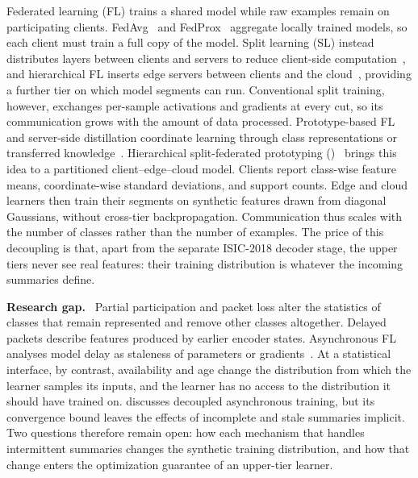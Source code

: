 Federated learning (FL) trains a shared model while raw examples remain on participating clients. FedAvg~\cite{mcmahan2017communication} and FedProx~\cite{li2020federated} aggregate locally trained models, so each client must train a full copy of the model. Split learning (SL) instead distributes layers between clients and servers to reduce client-side computation~\cite{vepakomma2018split}, and hierarchical FL inserts edge servers between clients and the cloud~\cite{liu2020client}, providing a further tier on which model segments can run. Conventional split training, however, exchanges per-sample activations and gradients at every cut, so its communication grows with the amount of data processed.
Prototype-based FL and server-side distillation coordinate learning through class representations or transferred knowledge~\cite{tan2022fedproto,lin2020ensemble,zhu2021data}. Hierarchical split-federated prototyping (\hsfp{})~\cite{tran2026h} brings this idea to a partitioned client--edge--cloud model. Clients report class-wise feature means, coordinate-wise standard deviations, and support counts. Edge and cloud learners then train their segments on synthetic features drawn from diagonal Gaussians, without cross-tier backpropagation. Communication thus scales with the number of classes rather than the number of examples. The price of this decoupling is that, apart from the separate ISIC-2018 decoder stage, the upper tiers never see real features: their training distribution is whatever the incoming summaries define.

\noindent\textbf{Research gap.}~
Partial participation and packet loss alter the statistics of classes that remain represented and remove other classes altogether. Delayed packets describe features produced by earlier encoder states. Asynchronous FL analyses model delay as staleness of parameters or gradients~\cite{xie2019asynchronous,nguyen2022federated,fraboni2023general}. At a statistical interface, by contrast, availability and age change the distribution from which the learner samples its inputs, and the learner has no access to the distribution it should have trained on. \hsfp{} discusses decoupled asynchronous training, but its convergence bound leaves the effects of incomplete and stale summaries implicit. Two questions therefore remain open: how each mechanism that handles intermittent summaries changes the synthetic training distribution, and how that change enters the optimization guarantee of an upper-tier learner.

